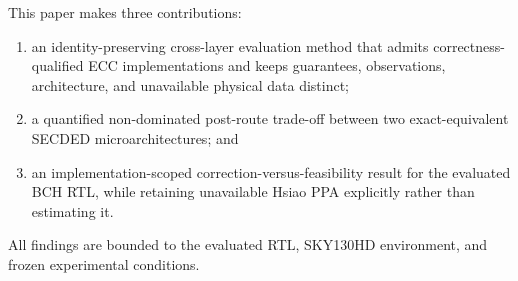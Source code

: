 This paper makes three contributions:

\begin{enumerate}
    \item an identity-preserving cross-layer evaluation method that admits correctness-qualified ECC implementations and keeps guarantees, observations, architecture, and unavailable physical data distinct;
    \item a quantified non-dominated post-route trade-off between two exact-equivalent SECDED microarchitectures; and
    \item an implementation-scoped correction-versus-feasibility result for the evaluated BCH RTL, while retaining unavailable Hsiao PPA explicitly rather than estimating it.
\end{enumerate}

All findings are bounded to the evaluated RTL, SKY130HD environment, and frozen experimental conditions.

